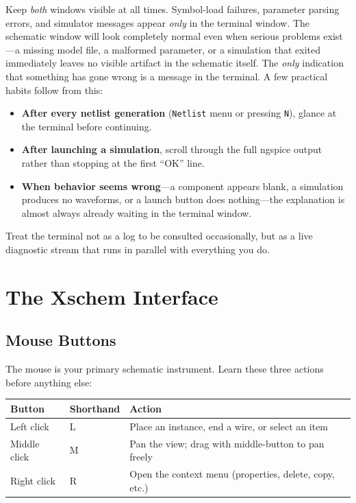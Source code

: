 \documentclass[11pt]{article}
\begin{document}
\begin{warnbox}
Keep \emph{both} windows visible at all times.
Symbol-load failures, parameter parsing errors, and simulator messages
appear \emph{only} in the terminal window.
The schematic window will look completely normal even when serious
problems exist---a missing model file, a malformed parameter, or a
simulation that exited immediately leaves no visible artifact in the
schematic itself.
The \emph{only} indication that something has gone wrong is a message
in the terminal.
A few practical habits follow from this:
\begin{itemize}
\item \textbf{After every netlist generation} (\texttt{Netlist} menu or
      pressing \texttt{N}), glance at the terminal before continuing.
\item \textbf{After launching a simulation}, scroll through the full
      ngspice output rather than stopping at the first ``OK'' line.
\item \textbf{When behavior seems wrong}---a component appears blank, a
      simulation produces no waveforms, or a launch button does
      nothing---the explanation is almost always already waiting in the
      terminal window.
\end{itemize}
Treat the terminal not as a log to be consulted occasionally, but as a
live diagnostic stream that runs in parallel with everything you do.
\end{warnbox}

\section{The Xschem Interface}

\subsection{Mouse Buttons}

The mouse is your primary schematic instrument.
Learn these three actions before anything else:

\begin{center}
\begin{tabular}{@{}llp{8cm}@{}}
\toprule
\textbf{Button} & \textbf{Shorthand} & \textbf{Action} \\
\midrule
Left click   & L & Place an instance, end a wire, or select an item \\
Middle click & M & Pan the view; drag with middle-button to pan freely \\
Right click  & R & Open the context menu (properties, delete, copy, etc.) \\
\bottomrule
\end{tabular}
\end{center}
\end{document}
